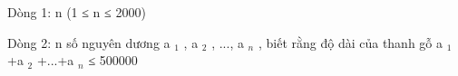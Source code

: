 Dòng 1: n (1 ≤ n ≤ 2000)

Dòng 2: n số nguyên dương a $_ 1 $ , a $_ 2 $ , ..., a $_ n $ , biết rằng độ dài của thanh gỗ a $_ 1 $ +a $_ 2 $ +...+a $_ n $ ≤ 500000